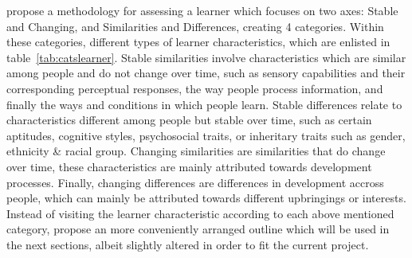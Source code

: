  propose a methodology for assessing a learner which focuses on two axes: Stable and Changing, and Similarities and Differences, creating 4 categories. Within these categories, different types of learner characteristics, which are enlisted in table~\ref{tab:catslearner}. Stable similarities involve characteristics which are similar among people and do not change over time, such as sensory capabilities and their corresponding perceptual responses, the way people process information, and finally the ways and conditions in which people learn. Stable differences relate to characteristics different among people but stable over time, such as certain aptitudes, cognitive styles, psychosocial traits, or inheritary traits such as gender, ethnicity \& racial group. Changing similarities are similarities that do change over time, these characteristics are mainly attributed towards development processes. Finally, changing differences are differences in development accross people, which can mainly be attributed towards different upbringings or interests. Instead of visiting the learner characteristic according to each above mentioned category,  propose an more conveniently arranged outline which will be used in the next sections, albeit slightly altered in order to fit the current project.

